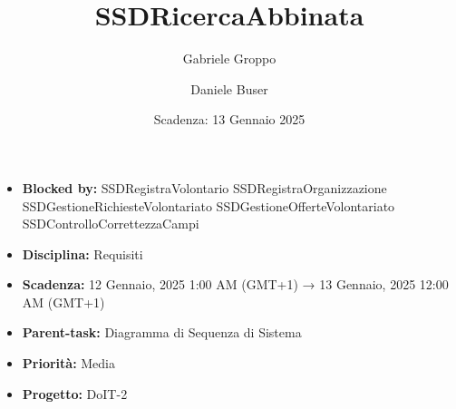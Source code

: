 \title{SSDRicercaAbbinata}
\author{Gabriele Groppo \and Daniele Buser}
\date{Scadenza: 13 Gennaio 2025}

\maketitle

\begin{itemize}
    \item \textbf{Blocked by:} SSDRegistraVolontario SSDRegistraOrganizzazione SSDGestioneRichiesteVolontariato SSDGestioneOfferteVolontariato SSDControlloCorrettezzaCampi
    \item \textbf{Disciplina:} Requisiti
    \item \textbf{Scadenza:} 12 Gennaio, 2025 1:00 AM (GMT+1) → 13 Gennaio, 2025 12:00 AM (GMT+1)
    \item \textbf{Parent-task:} Diagramma di Sequenza di Sistema
    \item \textbf{Priorità:} Media 
    \item \textbf{Progetto:} DoIT-2
\end{itemize}